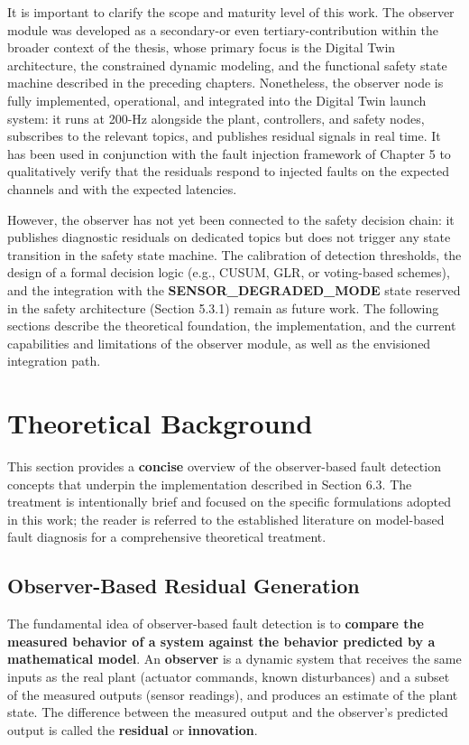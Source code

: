It is important to clarify the scope and maturity level of this work. The observer module was developed as a secondary-or even tertiary-contribution within the broader context of the thesis, whose primary focus is the Digital Twin architecture, the constrained dynamic modeling, and the functional safety state machine described in the preceding chapters. Nonetheless, the observer node is fully implemented, operational, and integrated into the Digital Twin launch system: it runs at 200-Hz alongside the plant, controllers, and safety nodes, subscribes to the relevant topics, and publishes residual signals in real time. It has been used in conjunction with the fault injection framework of Chapter 5 to qualitatively verify that the residuals respond to injected faults on the expected channels and with the expected latencies.

However, the observer has not yet been connected to the safety decision chain: it publishes diagnostic residuals on dedicated topics but does not trigger any state transition in the safety state machine. The calibration of detection thresholds, the design of a formal decision logic (e.g., CUSUM, GLR, or voting-based schemes), and the integration with the \textbf{SENSOR\_DEGRADED\_MODE} state reserved in the safety architecture (Section 5.3.1) remain as future work. The following sections describe the theoretical foundation, the implementation, and the current capabilities and limitations of the observer module, as well as the envisioned integration path.


\section{Theoretical Background}
This section provides a \textbf{concise} overview of the observer-based fault detection concepts that underpin the implementation described in Section 6.3. The treatment is intentionally brief and focused on the specific formulations adopted in this work; the reader is referred to the established literature on model-based fault diagnosis for a comprehensive theoretical treatment.

\subsection{Observer-Based Residual Generation}
The fundamental idea of observer-based fault detection is to \textbf{compare the measured behavior of a system against the behavior predicted by a mathematical model}. An \textbf{observer} is a dynamic system that receives the same inputs as the real plant (actuator commands, known disturbances) and a subset of the measured outputs (sensor readings), and produces an estimate of the plant state. The difference between the measured output and the observer's predicted output is called the \textbf{residual} or \textbf{innovation}.

